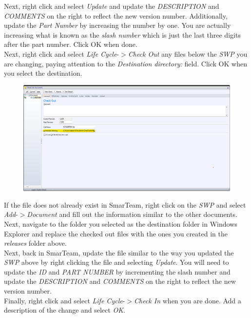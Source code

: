 \documentclass[10pt]{article}
\begin{document}
                Next, right click and select \emph{Update} and update the \emph{DESCRIPTION} and \emph{COMMENTS} on the right to reflect the new version number. Additionally, update the \emph{Part Number} by increasing the number by one. You are actually increasing what is known as the \emph{slash number} which is just the last three digits after the part number. Click OK when done. \\
                Next, right click and select \emph{Life Cycle}-$>$\emph{Check Out} any files below the \emph{SWP} you are changing, paying attention to the \emph{Destination directory:} field. Click OK when you select the destination.
                \begin{figure}[H]
                    \centerline{\includegraphics[width=\textwidth]{References/ST Check Out Window.png}}
                \end{figure}
                If the file does not already exist in SmarTeam, right click on the \emph{SWP} and select \emph{Add}-$>$\emph{Document} and fill out the information similar to the other documents. \\
                Next, navigate to the folder you selected as the destination folder in Windows Explorer and replace the checked out files with the ones you created in the \emph{releases} folder above. \\
                Next, back in SmarTeam, update the file similar to the way you updated the \emph{SWP} above by right clicking the file and selecting \emph{Update}. You will need to update the \emph{ID} and \emph{PART NUMBER} by incrementing the slash number and update the \emph{DESCRIPTION} and \emph{COMMENTS} on the right to reflect the new version number. \\
                Finally, right click and select \emph{Life Cycle}-$>$\emph{Check In} when you are done. Add a description of the change and select \emph{OK}.
\end{document}
